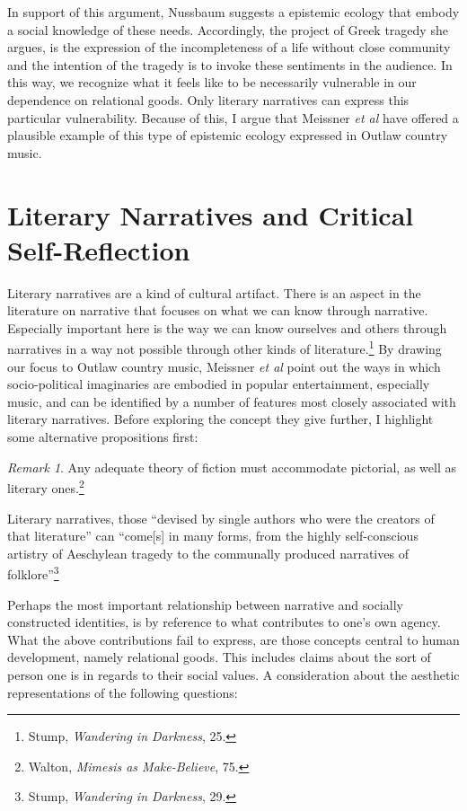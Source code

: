 \documentclass[phdthesis,12pt,final]{wuthesis}
\theoremstyle{definition}
\theoremstyle{definition}
\theoremstyle{definition}
\theoremstyle{definition}
\theoremstyle{remark}
\newtheorem*{remark}{Remark}
\begin{document}
In support of this argument, Nussbaum suggests a epistemic ecology that embody a social knowledge of these needs. Accordingly, the project of Greek tragedy she argues, is the expression of the incompleteness of a life without close community and the intention of the tragedy is to invoke these sentiments in the audience. In this way, we recognize what it feels like to be necessarily vulnerable in our dependence on relational goods. Only literary narratives can express this particular vulnerability. Because of this, I argue that Meissner \emph{et al} have offered a plausible example of this type of epistemic ecology expressed in Outlaw country music.

\section{Literary Narratives and Critical Self-Reflection}\label{literary-narratives-and-critical-self-reflection}

Literary narratives are a kind of cultural artifact. There is an aspect in the literature on narrative that focuses on what we can know through narrative. Especially important here is the way we can know ourselves and others through narratives in a way not possible through other kinds of literature.\footnote{Stump, \emph{Wandering in {Darkness}}, 25.} By drawing our focus to Outlaw country music, Meissner \emph{et al} point out the ways in which socio-political imaginaries are embodied in popular entertainment, especially music, and can be identified by a number of features most closely associated with literary narratives. Before exploring the concept they give further, I highlight some alternative propositions first:

\begin{remark}
Any adequate theory of fiction must accommodate pictorial, as well as literary ones.\footnote{Walton, \emph{Mimesis as {Make-Believe}}, 75.}

Literary narratives, those ``devised by single authors who were the creators of that literature'' can ``come{[}s{]} in many forms, from the highly self-conscious artistry of Aeschylean tragedy to the communally produced narratives of folklore''\footnote{Stump, \emph{Wandering in {Darkness}}, 29.}
\end{remark}

Perhaps the most important relationship between narrative and socially constructed identities, is by reference to what contributes to one's own agency. What the above contributions fail to express, are those concepts central to human development, namely relational goods. This includes claims about the sort of person one is in regards to their social values. A consideration about the aesthetic representations of the following questions:
\end{document}
